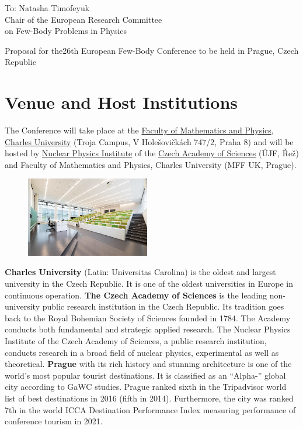 \documentclass[12pt]{extarticle}
\begin{document}
\color{C0}

\noindent
To: Natasha Timofeyuk \\
Chair of the European Research Committee \\
on Few-Body Problems in Physics

\bigskip\bigskip

\noindent
\doublespacing
{\color{C4}\selectfont%
  \LARGE Proposal for the\newline 26th
  European Few-Body Conference\newline
  to be held in Prague, Czech Republic%
}

\bigskip

\onehalfspacing
\section*{Venue and Host Institutions}
\noindent
%
The Conference will take place at the
\href{https://www.mff.cuni.cz/en}{Faculty of Mathematics and Physics},
\href{https://cuni.cz/UKEN-1.html}{Charles University} (Troja Campus,
V Holešovičkách 747/2, Praha 8) and will be hosted by
\href{http://www.ujf.cas.cz/en/}{Nuclear Physics Institute} of the
\href{https://www.avcr.cz/en/}{Czech Academy of Sciences} (ÚJF, Řež)
and Faculty of Mathematics and Physics, Charles University (MFF UK,
Prague).

\begin{figure}
  \centering
  \includegraphics[width=0.48\textwidth]{Impakt-troja_1}
\end{figure}

\textbf{Charles University} (Latin: Universitas Carolina) is the oldest and
largest university in the Czech Republic. It is one of the oldest
universities in Europe in continuous operation.
% 
\textbf{The Czech Academy of Sciences} is the leading non-university public
research institution in the Czech Republic. Its tradition goes back to
the Royal Bohemian Society of Sciences founded in 1784. The Academy
conducts both fundamental and strategic applied research. The
  Nuclear Physics Institute of the Czech Academy of Sciences, a
public research institution, conducts research in a broad field of
nuclear physics, experimental as well as theoretical.
%
\textbf{Prague} with its rich history and stunning architecture is one of the
world's most popular tourist destinations. It is classified as an
``Alpha-{}'' global city according to GaWC studies. Prague ranked sixth
in the Tripadvisor world list of best destinations in 2016 (fifth in
2014). Furthermore, the city was ranked 7th in the world ICCA
Destination Performance Index measuring performance of conference
tourism in 2021.
\end{document}
